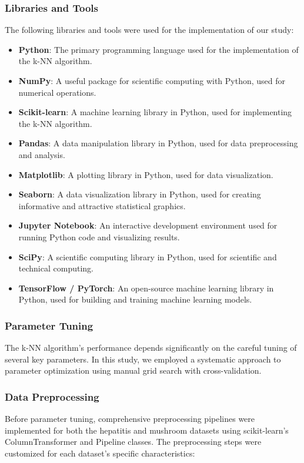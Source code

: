 \subsubsection*{Libraries and Tools}
The following libraries and tools were used for the implementation of our study:
\begin{itemize}
    \item \textbf{Python}: The primary programming language used for the implementation of the k-NN algorithm.
    \item \textbf{NumPy}: A useful package for scientific computing with Python, used for numerical operations.
    \item \textbf{Scikit-learn}: A machine learning library in Python, used for implementing the k-NN algorithm.
    \item \textbf{Pandas}: A data manipulation library in Python, used for data preprocessing and analysis.
    \item \textbf{Matplotlib}: A plotting library in Python, used for data visualization.
    \item \textbf{Seaborn}: A data visualization library in Python, used for creating informative and attractive statistical graphics.
    \item \textbf{Jupyter Notebook}: An interactive development environment used for running Python code and visualizing results.
    \item \textbf{SciPy}: A scientific computing library in Python, used for scientific and technical computing.
    \item \textbf{TensorFlow / PyTorch}: An open-source machine learning library in Python, used for building and training machine learning models.
\end{itemize}

\subsubsection{Parameter Tuning}
The k-NN algorithm's performance depends significantly on the careful tuning of several key parameters.
In this study, we employed a systematic approach to parameter optimization using manual grid search with
cross-validation.

\subsubsection*{Data Preprocessing}
Before parameter tuning, comprehensive preprocessing pipelines were implemented for both the hepatitis
and mushroom datasets using scikit-learn's ColumnTransformer and Pipeline classes.
The preprocessing steps were customized for each dataset's specific characteristics:

